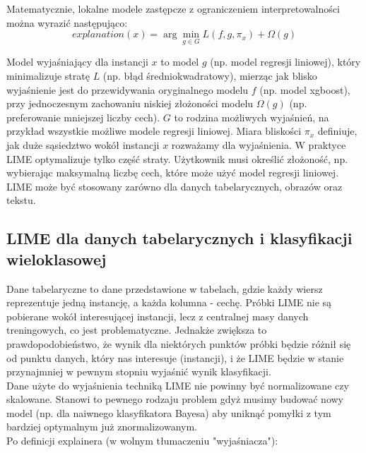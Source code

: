 Matematycznie, lokalne modele zastępcze z ograniczeniem interpretowalności można wyrazić następująco:\\

\begin{equation}
    {explanation}(x) = \arg\min_{g \in G} L(f, g, \pi_x) + \Omega(g)
\end{equation}

Model wyjaśniający dla instancji \( x \) to model \( g \) (np. model regresji liniowej), który minimalizuje stratę \( L \) (np. błąd średniokwadratowy), mierząc jak blisko wyjaśnienie jest do przewidywania oryginalnego modelu \( f \) (np. model xgboost), przy jednoczesnym zachowaniu niskiej złożoności modelu \( \Omega(g) \) (np. preferowanie mniejszej liczby cech). \( G \) to rodzina możliwych wyjaśnień, na przykład wszystkie możliwe modele regresji liniowej. Miara bliskości \( \pi_x \) definiuje, jak duże sąsiedztwo wokół instancji \( x \) rozważamy dla wyjaśnienia. W praktyce LIME optymalizuje tylko część straty. Użytkownik musi określić złożoność, np. wybierając maksymalną liczbę cech, które może użyć model regresji liniowej. \cite{lime}\\

LIME może być stosowany zarówno dla danych tabelarycznych, obrazów oraz tekstu.\\

\subsection{LIME dla danych tabelarycznych i klasyfikacji wieloklasowej}

Dane tabelaryczne to dane przedstawione w tabelach, gdzie każdy wiersz reprezentuje jedną instancję, a każda kolumna - cechę. Próbki LIME nie są pobierane wokół interesującej instancji, lecz z centralnej masy danych treningowych, co jest problematyczne. Jednakże zwiększa to prawdopodobieństwo, że wynik dla niektórych punktów próbki będzie różnił się od punktu danych, który nas interesuje (instancji), i że LIME będzie w stanie przynajmniej w pewnym stopniu wyjaśnić wynik klasyfikacji.\\

Dane użyte do wyjaśnienia techniką LIME nie powinny być normalizowane czy skalowane. Stanowi to pewnego rodzaju problem gdyż musimy budować nowy model (np. dla naiwnego klasyfikatora Bayesa) aby uniknąć pomyłki z tym bardziej optymalnym już znormalizowanym.\\

Po definicji explainera (w wolnym tłumaczeniu "wyjaśniacza"):

